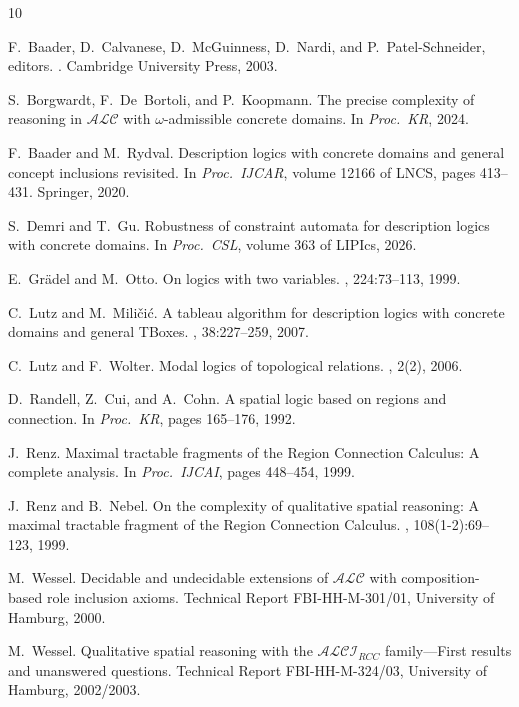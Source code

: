 \documentclass[a4paper,11pt]{article}
\theoremstyle{definition}
\begin{document}

\begin{thebibliography}{10}

F.~Baader, D.~Calvanese, D.~McGuinness, D.~Nardi, and P.~Patel-Schneider,
  editors.
.
\newblock Cambridge University Press, 2003.

S.~Borgwardt, F.~De~Bortoli, and P.~Koopmann.
\newblock The precise complexity of reasoning in {$\mathcal{ALC}$} with
  $\omega$-admissible concrete domains.
\newblock In {\em Proc.\ KR}, 2024.

F.~Baader and M.~Rydval.
\newblock Description logics with concrete domains and general concept
  inclusions revisited.
\newblock In {\em Proc.\ IJCAR}, volume 12166 of LNCS, pages 413--431.
  Springer, 2020.

S.~Demri and T.~Gu.
\newblock Robustness of constraint automata for description logics with
  concrete domains.
\newblock In {\em Proc.\ CSL}, volume 363 of LIPIcs, 2026.

E.~Gr\"{a}del and M.~Otto.
\newblock On logics with two variables.
, 224:73--113, 1999.

C.~Lutz and M.~Mili\v{c}i\'{c}.
\newblock A tableau algorithm for description logics with concrete domains and
  general {TBoxes}.
, 38:227--259, 2007.

C.~Lutz and F.~Wolter.
\newblock Modal logics of topological relations.
, 2(2), 2006.

D.~Randell, Z.~Cui, and A.~Cohn.
\newblock A spatial logic based on regions and connection.
\newblock In {\em Proc.\ KR}, pages 165--176, 1992.

J.~Renz.
\newblock Maximal tractable fragments of the {Region Connection Calculus}: A
  complete analysis.
\newblock In {\em Proc.\ IJCAI}, pages 448--454, 1999.

J.~Renz and B.~Nebel.
\newblock On the complexity of qualitative spatial reasoning: A maximal
  tractable fragment of the {Region Connection Calculus}.
, 108(1-2):69--123, 1999.

M.~Wessel.
\newblock Decidable and undecidable extensions of {$\mathcal{ALC}$} with
  composition-based role inclusion axioms.
\newblock Technical Report FBI-HH-M-301/01, University of Hamburg, 2000.

M.~Wessel.
\newblock Qualitative spatial reasoning with the {$\mathcal{ALCI}_\mathit{RCC}$}
  family---{F}irst results and unanswered questions.
\newblock Technical Report FBI-HH-M-324/03, University of Hamburg, 2002/2003.

\end{thebibliography}
\end{document}
